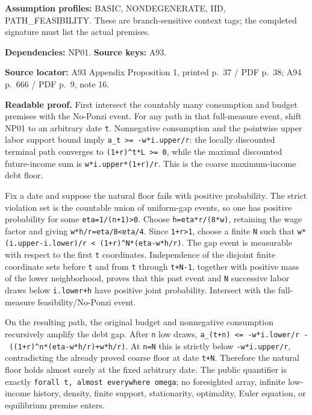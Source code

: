 \documentclass[
  11pt,
]{article}
\let\LedgerOriginalTexttt\texttt
\renewcommand{\texttt}[1]{{\small\LedgerOriginalTexttt{#1}}}
\begin{document}
\textbf{Assumption profiles:} BASIC, NONDEGENERATE, IID,
PATH\_FEASIBILITY. These are branch-sensitive context tags; the
completed signature must list the actual premises.

\textbf{Dependencies:} NP01. \textbf{Source keys:} A93.

\textbf{Source locator:} A93 Appendix Proposition 1, printed p.~37 / PDF
p.~38; A94 p.~666 / PDF p.~9, note 16.

\textbf{Readable proof.} First intersect the countably many consumption
and budget premises with the No-Ponzi event. For any path in that
full-measure event, shift NP01 to an arbitrary date \texttt{t}.
Nonnegative consumption and the pointwise upper labor support bound
imply \texttt{a\_t\ \textgreater{}=\ -w*i.upper/r}: the locally
discounted terminal path converges to
\texttt{(1+r)\^{}t*L\ \textgreater{}=\ 0}, while the maximal discounted
future-income sum is \texttt{w*i.upper*(1+r)/r}. This is the coarse
maximum-income debt floor.

Fix a date and suppose the natural floor fails with positive
probability. The strict violation set is the countable union of
uniform-gap events, so one has positive probability for some
\texttt{eta=1/(n+1)\textgreater{}0}. Choose \texttt{h=eta*r/(8*w)},
retaining the wage factor and giving
\texttt{w*h/r=eta/8\textless{}eta/4}. Since \texttt{1+r\textgreater{}1},
choose a finite \texttt{N} such that
\texttt{w*(i.upper-i.lower)/r\ \textless{}\ (1+r)\^{}N*(eta-w*h/r)}. The
gap event is measurable with respect to the first \texttt{t}
coordinates. Independence of the disjoint finite coordinate sets before
\texttt{t} and from \texttt{t} through \texttt{t+N-1}, together with
positive mass of the lower neighborhood, proves that this past event and
\texttt{N} successive labor draws below \texttt{i.lower+h} have positive
joint probability. Intersect with the full-measure feasibility/No-Ponzi
event.

On the resulting path, the original budget and nonnegative consumption
recursively amplify the debt gap. After \texttt{n} low draws,
\texttt{a\_(t+n)\ \textless{}=\ -w*i.lower/r\ -\ ((1+r)\^{}n*(eta-w*h/r)+w*h/r)}.
At \texttt{n=N} this is strictly below \texttt{-w*i.upper/r},
contradicting the already proved coarse floor at date \texttt{t+N}.
Therefore the natural floor holds almost surely at the fixed arbitrary
date. The public quantifier is exactly
\texttt{forall\ t,\ almost\ everywhere\ omega}; no foresighted array,
infinite low-income history, density, finite support, stationarity,
optimality, Euler equation, or equilibrium premise enters.
\end{document}
